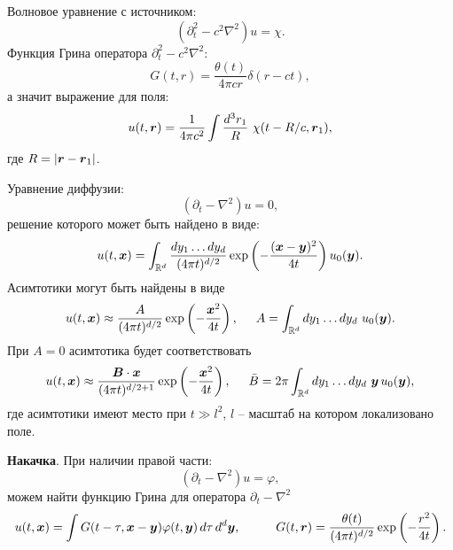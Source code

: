 



Волновое уравнение с источником:
\begin{equation}
    (\partial_t^2 - c^2 \nabla^2) u = \chi.
    \label{field_eq}
\end{equation}
Функция Грина оператора $\partial_t^2 - c^2 \nabla^2$:
\begin{equation*}
    G(t, r) = \frac{\theta(t)}{4 \pi c r} \delta(r - ct),
\end{equation*}
а значит выражение для поля:
\begin{equation}
    u(t, \mbox{\boldmath $r$}) = \frac{1}{4 \pi c^2} \int \frac{d^3 r_1}{R} \ \chi(t-R/c, \mbox{\boldmath $r$}_1),
    \label{field_sol}
\end{equation}
где $R = |\mbox{\boldmath $r$} - \mbox{\boldmath $r$}_1|$. 






Уравнение диффузии:
\begin{equation}
    \left(\partial_t - \nabla^2\right) u = 0,
    \label{difeq}
\end{equation}
решение которого может быть найдено в виде:
\begin{equation}
    u(t, \mbox{\boldmath $x$}) = \int_{\mathbb{R}^d} \frac{d y_1 \ldots d y_d}{(4 \pi t)^{d/2}} \exp\left(- \frac{(\mbox{\boldmath $x$}-\mbox{\boldmath $y$})^2}{4 t}\right) u_0(\mbox{\boldmath $y$}).
    \label{difsol}
\end{equation}
Асимтотики могут быть найдены в виде
\begin{equation}
    u(t, \mbox{\boldmath $x$}) \approx \frac{A}{(4 \pi t)^{d/2}} \exp\left(- \frac{\mbox{\boldmath $x$}^2}{4 t}\right),
    \hspace{5 mm} 
    A = \int_{ \mathbb{R}^d} dy_1 \ldots dy_d \ u_0(\mbox{\boldmath $y$}).
    \label{difas1}
\end{equation}
При $A = 0$ асимтотика будет соответствовать
\begin{equation}
    u(t, \mbox{\boldmath $x$}) \approx  \frac{\mbox{\boldmath $B$} \cdot \mbox{\boldmath $x$}}{(4 \pi t)^{d/2+1}} \exp\left(
        - \frac{\mbox{\boldmath $x$}^2}{4 t}
    \right), \hspace{5 mm} 
    \bar{B} = 2 \pi \int_{ \mathbb{R}^d} dy_1 \ldots dy_d \ \mbox{\boldmath $y$}\, u_0(\mbox{\boldmath $y$}),
    \label{difas2}
\end{equation}
где асимтотики имеют место при $t \gg l^2$, $l$ -- масштаб на котором локализовано поле.

\textbf{Накачка}. 
При наличии правой части:
\begin{equation*}
    (\partial_t - \nabla^2) u = \varphi,
\end{equation*}
можем найти функцию Грина для оператора $\partial_t - \nabla^2$
\begin{equation*}
    u(t, \vc{x}) =  \int G(t-\tau, \vc{x}-\vc{y}) \varphi(t, \vc{y}) \d \tau \d^d \vc{y},
    \hspace{10 mm} 
    G(t, \vc{r}) = \frac{\theta(t)}{(4 \pi t)^{d/2}} \exp\left(- \frac{r^2}{4 t}\right).
\end{equation*}
